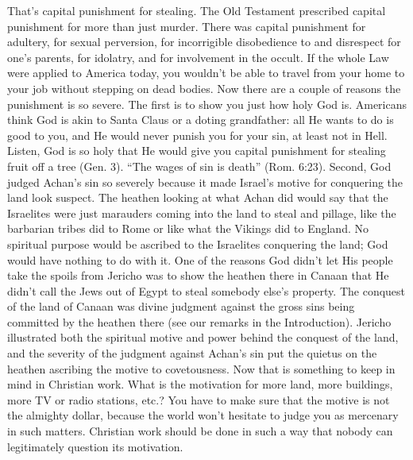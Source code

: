 {That’s capital punishment for stealing. The Old
Testament prescribed capital punishment for
more than just murder. There was capital
punishment for adultery, for sexual perversion,
for incorrigible disobedience to and disrespect
for one’s parents, for idolatry, and for
involvement in the occult. If the whole Law
were applied to America today, you wouldn’t
be able to travel from your home to your job
without stepping on dead bodies.
Now there are a couple of reasons the
punishment is so severe. The first is to show
you just how holy God is. Americans think God
is akin to Santa Claus or a doting grandfather:
all He wants to do is good to you, and He
would never punish you for your sin, at least
not in Hell. Listen, God is so holy that He
would give you capital punishment for stealing
fruit off a tree (Gen. 3). “The wages of sin is
death” (Rom. 6:23).
Second, God judged Achan’s sin so
severely because it made Israel’s motive for
conquering the land look suspect. The heathen
looking at what Achan did would say that the
Israelites were just marauders coming into the
land to steal and pillage, like the barbarian tribes
did to Rome or like what the Vikings did to
England. No spiritual purpose would be
ascribed to the Israelites conquering the land;
God would have nothing to do with it.
One of the reasons God didn’t let His
people take the spoils from Jericho was to show
the heathen there in Canaan that He didn’t call
the Jews out of Egypt to steal somebody else’s
property. The conquest of the land of Canaan
was divine judgment against the gross sins being
committed by the heathen there (see our
remarks in the Introduction). Jericho illustrated
both the spiritual motive and power behind the
conquest of the land, and the severity of the
judgment against Achan’s sin put the quietus on
the heathen ascribing the motive to
covetousness.
Now that is something to keep in mind in
Christian work. What is the motivation for more
land, more buildings, more TV or radio
stations, etc.? You have to make sure that the
motive is not the almighty dollar, because the
world won’t hesitate to judge you as mercenary
in such matters. Christian work should be done
in such a way that nobody can legitimately
question its motivation.}
